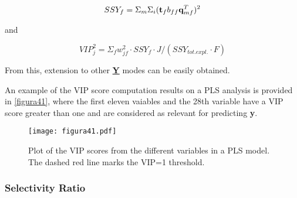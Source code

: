\begin{equation}
SSY_{f}=\Sigma_m\Sigma_i(\textbf{\text{t}}_fb_{ff}\textbf{\text{q}}^T_{mf})^2
\label{equation28}
\end{equation}

and

\begin{equation}
VIP^2_j=\Sigma_fw^2_{jf} \cdot SSY_{f} \cdot J/(SSY_{tot.expl.} \cdot F)
\label{equation29}
\end{equation}

From this, extension to other \textbf{\underline{Y}} modes can be easily obtained.

An example of the VIP score computation results on a PLS analysis is provided in \autoref{figura41}, where the first eleven vaiables and the 28th variable have a VIP score greater than one and are considered as relevant for predicting \textbf{y}.

\begin{figure}[hbtp]
\centering
\texttt{[image: figura41.pdf]}
\caption{Plot of the VIP scores from the different variables in a PLS model. The dashed red line marks the VIP=1 threshold.}
\label{figura41}
\end{figure}

\subsubsection{Selectivity Ratio}
